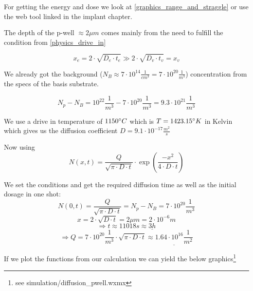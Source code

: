 For getting the energy and dose we look at \autoref{graphics_range_and_straggle} or use the web tool linked in the implant chapter.

The depth of the p-well $\approx 2 \mu m$ comes mainly from the need to fulfill the condition from \autoref{physics_drive_in}

\begin{equation}
x_e = 2 \cdot \sqrt{D_e \cdot t_e} \gg 2 \cdot \sqrt{D_v \cdot t_v} = x_v
\end{equation}

\newpage

We already got the background ($N_B \approx 7 \cdot 10^{14} \frac{1}{cm^3}=7 \cdot 10^{20} \frac{1}{m^3}$) concentration from the specs of the basis substrate.

\begin{equation}
N_p - N_B = 10^{22}\frac{1}{m^3} - 7 \cdot 10^{20} \frac{1}{m^3} = 9.3 \cdot 10^{21} \frac{1}{m^3}
\end{equation}

We use a drive in temperature of $1150 \degree C$ which is  $T = 1423.15 \degree K$ in Kelvin which gives us the diffusion coefficient $D=9.1 \cdot 10^{-17}  \frac{m^2}{s}$

Now using
\begin{equation}
N(x,t)
=
\frac{Q}{\sqrt{\pi\cdot D \cdot t}} \cdot \exp\left(\frac{-x^2}{4 \cdot D \cdot t}\right)
\end{equation}

We set the conditions and get the required diffusion time as well as the initial dosage in one shot:
\begin{equation}
N(0,t)
=
\frac{Q}{\sqrt{\pi\cdot D \cdot t}}
=
N_p-N_B
=
7 \cdot 10^{20} \frac{1}{m^3}
\end{equation}
\begin{equation}
x
=
2 \cdot \sqrt{D \cdot t}
=
2 \mu m
=
2 \cdot 10^{-6} m
\end{equation}
\begin{equation}
\Rightarrow
t \approx 11018s \approx \underline{3h}
\end{equation}
\begin{equation}
\Rightarrow
Q
=
7 \cdot 10^{20} \frac{1}{m^3} \cdot \sqrt{\pi\cdot D \cdot t}
\approx
\underline{1.64 \cdot 10^{16} \frac{1}{m^2}}
\end{equation}

If we plot the functions from our calculation we can yield the below graphics\footnote{see simulation/diffusion\_pwell.wxmx}

